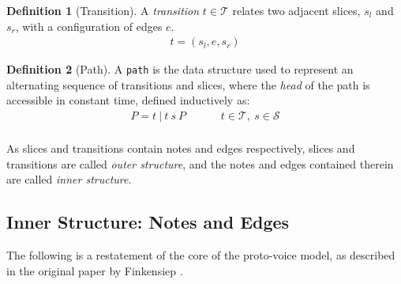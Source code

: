 \documentclass[12pt,a4paper,twoside,openany]{report} \usepackage[pdfborder={0 0 0}]{hyperref}    %
\theoremstyle{definition} \newtheorem{definition}{Definition}[section]
\begin{document}
\begin{definition}[Transition] 
  A \textit{transition} $t \in \mathcal{T}$ relates two adjacent slices, $s_l$ and $s_r$,
  with a configuration of edges $e$. 
  \begin{equation} 
    \begin{aligned} 
      t = (s_l, e, s_r)
    \end{aligned} 
    \label{eq:transition} 
  \end{equation} 
\end{definition}


  \begin{definition}[Path] A \texttt{path} is the data structure used to represent an alternating sequence of
    transitions and slices, where the \textit{head} of the path is accessible in constant time, defined inductively as:
      \begin{equation} 
        \begin{aligned} 
          P = t~|~t~s~P  &&&& t \in \mathcal{T},~s \in \mathcal{S}\\ 
        \end{aligned}
      \label{eq:pathGraph} 
      \end{equation} 
      \label{def:pathGraph} 
    \end{definition}

  As slices and transitions contain notes and edges respectively, slices and transitions are called \textit{outer
  structure}, and the notes and edges contained therein are called \textit{inner structure}.

\subsection{Inner Structure: Notes and Edges} 
\label{sub:Inner Structure}
The following is a restatement of the core of the proto-voice model,  as described in the original paper by Finkensiep \cite{finkensiepModelingInferringProtovoice2021}.
\end{document}
